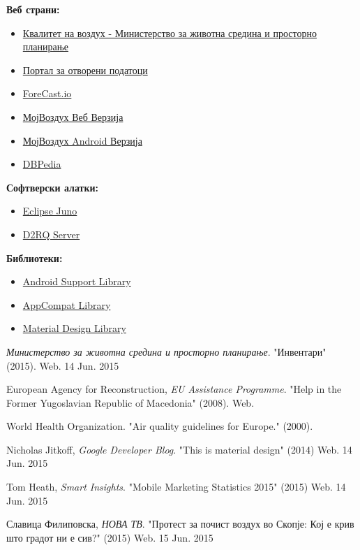\documentclass{uvamscse}
\begin{document}
\textbf{\large{Веб страни:}}
\begin{itemize}
\item \href{http://airquality.moepp.gov.mk/}{Квалитет на воздух - Министерство за животна средина и просторно планирање}
\item \href{http://otvorenipodatoci.gov.mk/}{Портал за отворени податоци}
\item \href{http://forecast.io/}{ForeCast.io}
\item \href{http://gorjan.rocks/clients/airquality/}{МојВоздух Веб Верзија}
\item \href{https://play.google.com/store/apps/details?id=com.gorjan.airquality}{МојВоздух Android Верзија}
\item \href{http://dbpedia.org/}{DBPedia}
\end{itemize}


\textbf{\large{Софтверски алатки:}}
\begin{itemize}
\item \href{https://eclipse.org/}{Eclipse Juno}
\item \href{http://d2rq.org/d2r-server}{D2RQ Server}
\end{itemize}


\textbf{\large{Библиотеки:}}
\begin{itemize}
\item \href{http://developer.android.com/tools/support-library/index.html}{Android Support Library}
\item \href{http://android-developers.blogspot.com/2014/10/appcompat-v21-material-design-for-pre.html}{AppCompat Library}
\item \href{https://github.com/navasmdc/MaterialDesignLibrary}{Material Design Library}
\end{itemize}




\begin{thebibliography}{1}
\emph{Министерство за животна средина и просторно планирање}. "Инвентари" (2015). Web. 14 Jun. 2015

European Agency for Reconstruction, \emph{EU Assistance Programme}. "Help in the Former Yugoslavian Republic of Macedonia" (2008). Web.

World Health Organization. "Air quality guidelines for Europe." (2000).

Nicholas Jitkoff, \emph{Google Developer Blog}. "This is material design" (2014) Web. 14 Jun. 2015

Tom Heath, \emph{Smart Insights}. "Mobile Marketing Statistics 2015" (2015) Web. 14 Jun. 2015

Славица Филиповска, \emph{НОВА ТВ}. "Протест за почист воздух во Скопје: Кој е крив што градот ни е сив?" (2015) Web. 15 Jun. 2015


\end{thebibliography}
\end{document}
